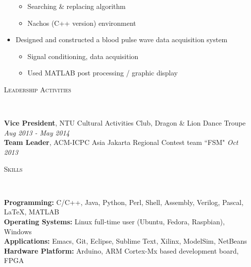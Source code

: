 \documentclass[a4paper, 10pt]{article}
\newenvironment{changemargin}[2]{%
  \begin{list}{}{%
      \setlength{\topsep}{0pt}%
      \setlength{\leftmargin}{#1}%
      \setlength{\rightmargin}{#2}%
      \setlength{\listparindent}{\parindent}%
      \setlength{\itemindent}{\parindent}%
      \setlength{\parsep}{\parskip}%
    }%
  \item[]}{\end{list}
}
\newcommand{\lineover}{
  \begin{changemargin}{-0.05in}{-0.05in}
    \vspace*{-8pt}
    \hrulefill \\
    \vspace*{-2pt}
  \end{changemargin}
}
\newcommand{\header}[1]{
  \begin{changemargin}{-0.5in}{-0.5in}
    \scshape{#1}\\
    \lineover
  \end{changemargin}
}
\newenvironment{body}
{
\vspace*{-16pt}
\begin{changemargin}{-0.25in}{-0.5in}
}	
{
\end{changemargin}
}
\begin{document}
\begin{body}
\begin{itemize}
    \begin{itemize} \itemsep -0pt \small
        \item Searching \& replacing algorithm
        \item Nachos (C++ version) environment
    \end{itemize}
  \item Designed and constructed a blood pulse wave data acquisition system
    \begin{itemize} \itemsep -0pt \small
        \item Signal conditioning, data acquisition
        \item Used MATLAB post processing / graphic display
    \end{itemize}
  \end{itemize}
\end{body}

\pagebreak
\header{Leadership Activities}
\begin{body}
  \vspace{14pt}
  \textbf{Vice President}, NTU Cultural Activities Club, Dragon \& Lion Dance Troupe \hfill {} \emph{Aug 2013 - May 2014}\\
  \smallskip
  \textbf{Team Leader}, ACM-ICPC Asia Jakarta Regional Contest team ``FSM" \hfill {} \emph{Oct 2013}\\
\end{body}

%
%
\header{Skills}

\begin{body}
  \vspace{14pt}
  \textbf{Programming:}{} C/C++, Java, Python, Perl, Shell, Assembly, Verilog, Pascal, \LaTeX, MATLAB\\
  \medskip
  \textbf{Operating Systems:}{} Linux full-time user (Ubuntu, Fedora, Raspbian), Windows\\
  \medskip
  \textbf{Applications:}{} Emacs, Git, Eclipse, Sublime Text, Xilinx, ModelSim, NetBeans\\
  \medskip
  \textbf{Hardware Platform:}{} Arduino, ARM Cortex-Mx based development board, FPGA\\
\end{body}
\end{document}
